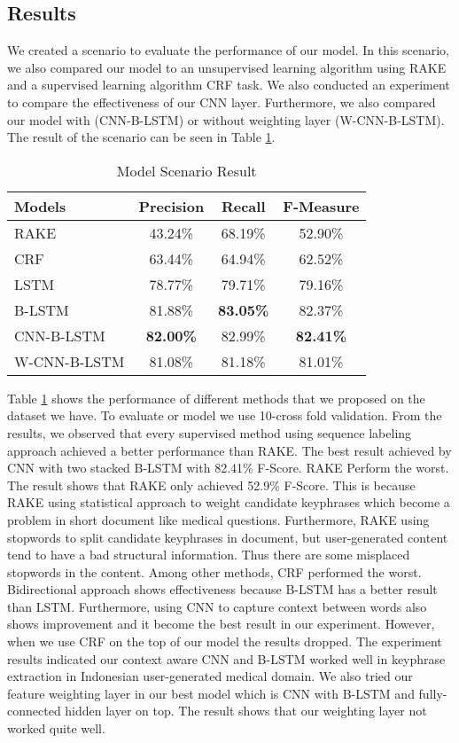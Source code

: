 \subsection{Results}
We created a scenario to evaluate the performance of our model. In this scenario, we also compared our model to an unsupervised learning algorithm using RAKE \cite{rake} and a supervised learning algorithm CRF task. We also conducted an experiment to compare the effectiveness of our CNN layer. Furthermore, we also compared our model with (CNN-B-LSTM) or without weighting layer (W-CNN-B-LSTM). The result of the scenario can be seen in Table \ref{tab:model_scenario}.
\begin{table}
	\caption{Model Scenario Result}
	\label{tab:model_scenario}
	\begin{tabular}{lccc}
		\toprule
		Models&Precision&Recall&F-Measure\\
		\midrule
		RAKE & 43.24\% & 68.19\% & 52.90\% \\
		
		CRF & 63.44\% & 64.94\% & 62.52\% \\
		
		LSTM & 78.77\% & 79.71\% & 79.16\% \\
		
		B-LSTM & 81.88\% & \textbf{83.05\%} & 82.37\% \\
		
		CNN-B-LSTM & \textbf{82.00\%} & 82.99\% & \textbf{82.41\%} \\
		
		W-CNN-B-LSTM & 81.08\% & 81.18\% & 81.01\% \\
		\bottomrule
	\end{tabular}
\end{table}
Table \ref{tab:model_scenario} shows the performance of different methods that we proposed on the dataset we have. To evaluate or model we use 10-cross fold validation. From the results, we observed that every supervised method using sequence labeling approach achieved a better performance than RAKE. The best result achieved by CNN with two stacked B-LSTM with 82.41\% F-Score. RAKE Perform the worst. The result shows that RAKE only achieved 52.9\% F-Score. This is because RAKE using statistical approach to weight candidate keyphrases which become a problem in short document like medical questions. Furthermore, RAKE using stopwords to split candidate keyphrases in document, but user-generated content tend to have a bad structural information. Thus there are some misplaced stopwords in the content. Among other methods, CRF performed the worst. Bidirectional approach shows effectiveness because B-LSTM has a better result than LSTM. Furthermore, using CNN to capture context between words also shows improvement and it become the best result in our experiment. However, when we use CRF on the top of our model the results dropped. The experiment results indicated our context aware CNN and B-LSTM worked well in keyphrase extraction in Indonesian user-generated medical domain. We also tried our feature weighting layer in our best model which is CNN with B-LSTM and fully-connected hidden layer on top. The result shows that our weighting layer not worked quite well.

